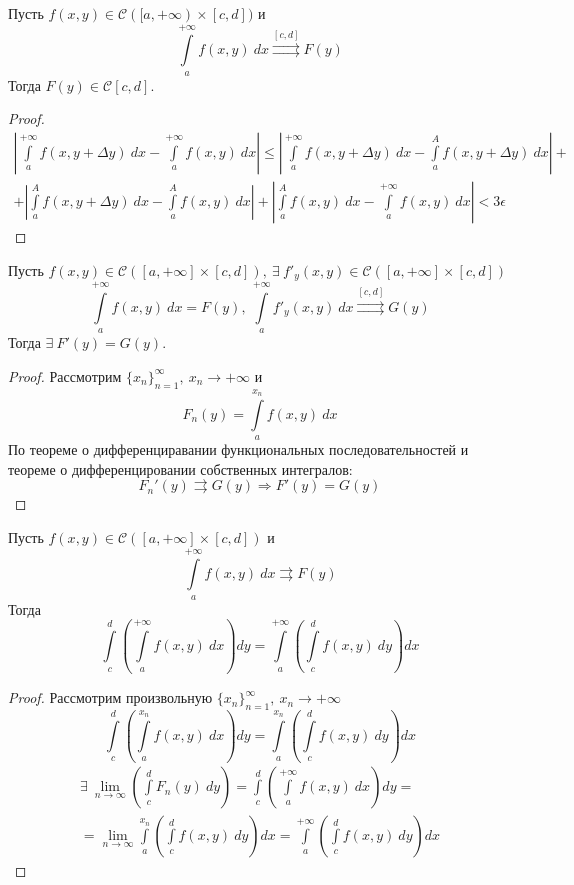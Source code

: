 \begin{theorem}
    Пусть $f(x,y)\in \mathcal{C}([a,+\infty)\times [c,d])$ и 
    \[\int\limits_{a}^{+\infty}f(x,y)\ dx \overset{[c,d]}{\rightrightarrows}F(y)\]
    Тогда $F(y)\in \mathcal{C}[c,d]$.
\end{theorem}
\begin{proof}
    \begin{multline*}
        \left|\int\limits_{a}^{+\infty} f(x,y+\Delta y)\ dx-\int\limits_{a}^{+\infty} f(x,y)\ dx\right|\leq \left|\int\limits_{a}^{+\infty}f(x,y+\Delta y)\ dx-\int\limits_{a}^{A}f(x,y+\Delta y)\ dx\right|+\\
        +\left|\int\limits_{a}^{A}f(x,y+\Delta y)\ dx-\int\limits_{a}^{A}f(x,y)\ dx\right|+\left|\int\limits_{a}^{A}f(x,y)\ dx-\int\limits_{a}^{+\infty}f(x,y)\ dx\right|<3\epsilon
    \end{multline*}
\end{proof}
\begin{theorem}
    Пусть $f(x,y)\in \mathcal{C}([a,+\infty]\times [c,d]),\ \exists\ f'_y(x,y)\in \mathcal{C}([a,+\infty]\times [c,d])$
    \[\int\limits_{a}^{+\infty}f(x,y)\ dx=F(y),\ \int\limits_{a}^{+\infty}f'_y(x,y)\ dx\overset{[c,d]}{\rightrightarrows} G(y)\]
    Тогда $\exists\ F'(y)=G(y)$.
\end{theorem}
\begin{proof}
    Рассмотрим $\{x_n\}_{n=1}^{\infty},\ x_n\to +\infty$ и
    \[F_n(y)=\int\limits_{a}^{x_n}f(x,y)\ dx\]
    По теореме о дифференциравании функциональных последовательностей и теореме о дифференцировании собственных интегралов:
    \[F_n'(y)\rightrightarrows G(y) \Rightarrow F'(y)=G(y)\]
\end{proof}
\begin{theorem}
    Пусть $f(x,y)\in \mathcal{C}([a,+\infty]\times [c,d])$ и
    \[\int\limits_{a}^{+\infty}f(x,y)\ dx\rightrightarrows F(y)\]
    Тогда 
    \[\int\limits_{c}^{d}\left(\int\limits_{a}^{+\infty}f(x,y)\ dx\right)dy=\int\limits_{a}^{+\infty}\left(\int\limits_{c}^{d}f(x,y)\ dy\right)dx\]
\end{theorem}
\begin{proof}
    Рассмотрим произвольную $\{x_n\}_{n=1}^{\infty},\ x_n\to +\infty$
    \[\int\limits_{c}^{d}\left(\int\limits_{a}^{x_n}f(x,y)\ dx\right)dy=\int\limits_{a}^{x_n}\left(\int\limits_{c}^{d}f(x,y)\ dy\right)dx\]
    \begin{multline*}
        \exists\ \lim\limits_{n\to\infty}\left(\int\limits_{c}^{d}F_n(y)\ dy\right)=\int\limits_{c}^{d}\left(\int\limits_{a}^{+\infty}f(x,y)\ dx\right)dy=\\
        =\lim\limits_{n\to\infty}\int\limits_{a}^{x_n}\left(\int\limits_{c}^{d}f(x,y)\ dy\right)dx=\int\limits_{a}^{+\infty}\left(\int\limits_{c}^{d}f(x,y)\ dy\right)dx
    \end{multline*}
\end{proof}
